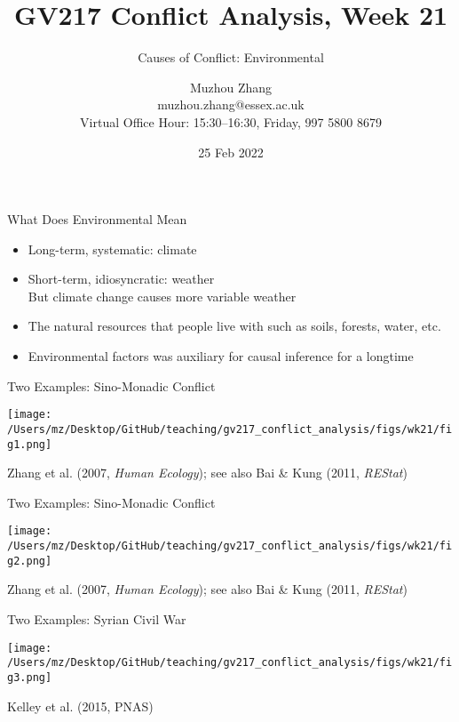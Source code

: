 \documentclass[handout]{beamer}
\title{GV217 Conflict Analysis, Week 21}
\subtitle{Causes of Conflict: Environmental}
\author{Muzhou Zhang\\ muzhou.zhang@essex.ac.uk\\ Virtual Office Hour: 15:30--16:30, Friday, 997 5800 8679}
\date{25 Feb 2022}
\begin{document}
\maketitle
{}

\begin{frame}{What Does Environmental Mean}
    \begin{itemize}
        \pause\item Long-term, systematic: climate
        \pause\item Short-term, idiosyncratic: weather\\
        \pause      But climate change causes more variable weather
        \pause\item The natural resources that people live with
        \pause      such as soils, forests, water, etc.
        \pause\item Environmental factors was auxiliary for causal inference for a longtime
    \end{itemize}
\end{frame}

\begin{frame}{Two Examples: Sino-Monadic Conflict}
    \pause
    \begin{center}
        \texttt{[image: /Users/mz/Desktop/GitHub/teaching/gv217\_conflict\_analysis/figs/wk21/fig1.png]}
    \end{center}
    \tiny Zhang et al. (2007, \emph{Human Ecology}); see also Bai \& Kung (2011, \emph{REStat})
\end{frame}

\begin{frame}{Two Examples: Sino-Monadic Conflict}
    \pause
    \begin{center}
        \texttt{[image: /Users/mz/Desktop/GitHub/teaching/gv217\_conflict\_analysis/figs/wk21/fig2.png]}
    \end{center}
    \tiny Zhang et al. (2007, \emph{Human Ecology}); see also Bai \& Kung (2011, \emph{REStat})
\end{frame}

\begin{frame}{Two Examples: Syrian Civil War}
    \pause
    \begin{center}
        \texttt{[image: /Users/mz/Desktop/GitHub/teaching/gv217\_conflict\_analysis/figs/wk21/fig3.png]}
    \end{center}
    \tiny Kelley et al. (2015, PNAS) 
\end{frame}
\end{document}
